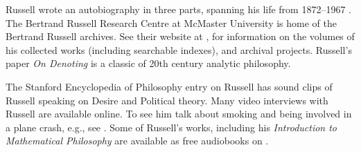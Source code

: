 \documentclass[../../../include/open-logic-section]{subfiles}
\begin{document}
\begin{reading}
Russell wrote an autobiography in three parts, spanning his life from
1872--1967 \cite{Russell1967,Russell1968,Russell1969}.  The Bertrand
Russell Research Centre at McMaster University is home of the Bertrand
Russell archives. See their website at \cite{Duncan2015}, for
information on the volumes of his collected works (including
searchable indexes), and archival projects.  Russell's paper \emph{On
  Denoting} \cite{Russell1905} is a classic of 20th century analytic
philosophy.

The Stanford Encyclopedia of Philosophy entry on Russell
\cite{Irvine2015} has sound clips of Russell speaking on Desire and
Political theory. Many video interviews with Russell are available
online. To see him talk about smoking and being involved in a plane
crash, e.g., see \cite{RussellND}. Some of Russell's works, including
his \emph{Introduction to Mathematical Philosophy} are available as
free audiobooks on \cite{LibriVoxND}.
\end{reading}
\end{document}
